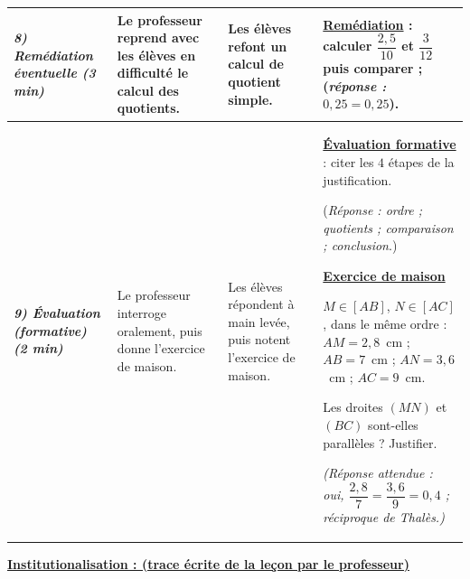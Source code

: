 \documentclass[10pt]{article}
\newcommand{\titreR}[1]{\underline{\textcolor{rougetitre}{\bfseries #1}}}
\newcommand{\maison}{\underline{\textcolor{rougemaison}{\bfseries Exercice de maison}}}
\newcommand{\moment}[1]{\textbf{\itshape #1}}
\begin{document}
\begin{longtable}{|p{2.35cm}|p{5.35cm}|p{4.55cm}|p{13.85cm}|}
\moment{8) Remédiation éventuelle (3 min)} &
Le professeur reprend avec les élèves en difficulté  le calcul des quotients. &
Les élèves refont  un calcul de quotient simple. &
\titreR{Remédiation} : calculer $\dfrac{2{,}5}{10}$ et $\dfrac{3}{12}$ puis
comparer ; (\textit{réponse : $0{,}25=0{,}25$}). \\ \hline

\moment{9) Évaluation (formative) (2 min)} &
Le professeur interroge oralement, puis donne l'exercice de maison. &
Les élèves répondent à main levée, puis notent l'exercice de maison. &
\titreR{Évaluation formative} : citer les $4$ étapes de la justification. \par
(\textit{Réponse : ordre ; quotients ; comparaison ; conclusion}.) \par
\maison \par
$M\in[AB]$, $N\in[AC]$, dans le même ordre : $AM=2{,}8$~cm ; $AB=7$~cm ;
$AN=3{,}6$~cm ; $AC=9$~cm. \par
Les droites $(MN)$ et $(BC)$ sont-elles parallèles ? Justifier. \par
\textit{(Réponse attendue : oui, $\dfrac{2{,}8}{7}=\dfrac{3{,}6}{9}=0{,}4$ ;
réciproque de Thalès.)} \\ \hline
\end{longtable}

\begin{center}
\underline{\textcolor{rougetitre}{\large\bfseries Institutionalisation \; : \; (trace écrite de la leçon par le professeur)}}
\end{center}
\end{document}
